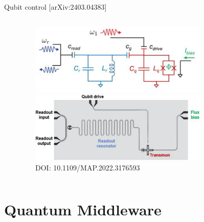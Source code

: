 \documentclass[aspectratio=169,10pt]{beamer}
\begin{document}
\begin{frame}{Qubit control \hfill{\small[arXiv:2403.04383]}}
\begin{columns}
\begin{column}{0.45\textwidth}
    \end{column}
    \begin{column}{0.55\textwidth}
      \centering
      \begin{figure}
        \centering
        \vspace{2mm}
        \includegraphics[width=0.8\textwidth]{figures/TransmonCircuit.png}\\
        \vspace{1.5em}
        \includegraphics[width=0.8\textwidth]{figures/TransmonBoard.png}\\
        {\tiny DOI: 10.1109/MAP.2022.3176593}
      \end{figure}
    \end{column}
  \end{columns}   


\end{frame}



\section{Quantum Middleware}
\end{document}
